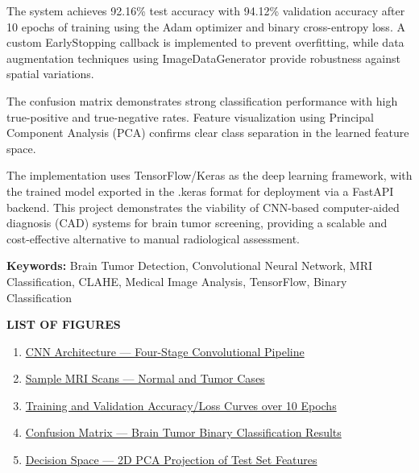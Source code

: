 \documentclass[12pt,a4paper]{article}
\begin{document}
The system achieves 92.16\% test accuracy with 94.12\% validation accuracy after 10 epochs of training using the Adam optimizer and binary cross-entropy loss. A custom EarlyStopping callback is implemented to prevent overfitting, while data augmentation techniques using ImageDataGenerator provide robustness against spatial variations.

The confusion matrix demonstrates strong classification performance with high true-positive and true-negative rates. Feature visualization using Principal Component Analysis (PCA) confirms clear class separation in the learned feature space.

The implementation uses TensorFlow/Keras as the deep learning framework, with the trained model exported in the .keras format for deployment via a FastAPI backend. This project demonstrates the viability of CNN-based computer-aided diagnosis (CAD) systems for brain tumor screening, providing a scalable and cost-effective alternative to manual radiological assessment.

\vspace{0.5cm}
\noindent\textbf{Keywords:} Brain Tumor Detection, Convolutional Neural Network, MRI Classification, CLAHE, Medical Image Analysis, TensorFlow, Binary Classification

\newpage

\tableofcontents
\newpage

\newpage
\begin{center}
    {\Large\textbf{LIST OF FIGURES}}
\end{center}

\begin{enumerate}
    \item \hyperlink{fig:arch}{CNN Architecture --- Four-Stage Convolutional Pipeline}
    \item \hyperlink{fig:samples}{Sample MRI Scans --- Normal and Tumor Cases}
    \item \hyperlink{fig:curves}{Training and Validation Accuracy/Loss Curves over 10 Epochs}
    \item \hyperlink{fig:confusion}{Confusion Matrix --- Brain Tumor Binary Classification Results}
    \item \hyperlink{fig:pca}{Decision Space --- 2D PCA Projection of Test Set Features}
\end{enumerate}

\newpage
\end{document}
